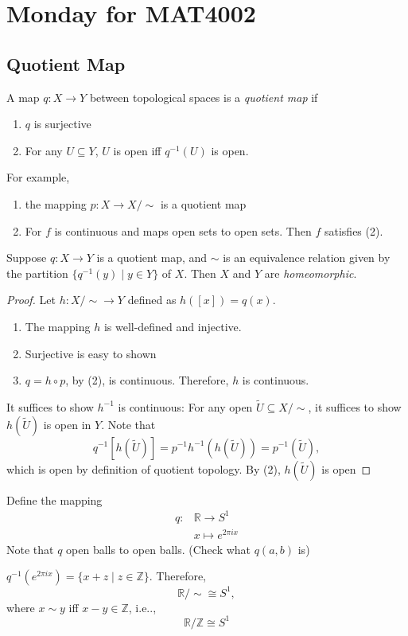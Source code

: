 \section{Monday for MAT4002}
\subsection{Quotient Map}
\begin{definition}
A map $q:X\to Y$ between topological spaces is a \emph{quotient map} if 
\begin{enumerate}
\item
$q$ is surjective
\item
For any $U\subseteq Y$, $U$ is open iff $q^{-1}(U)$ is open.
\end{enumerate}
\end{definition}
For example, 
\begin{enumerate}
\item
the mapping $p:X\to X/\sim$ is a quotient map
\item
For $f$ is continuous and maps open sets to open sets. Then $f$ satisfies (2).
\end{enumerate}

\begin{proposition}
Suppose $q:X\to Y$ is a quotient map, and $\sim$ is an equivalence relation given by the partition $\{q^{-1}(y)\mid y\in Y\}$ of $X$.
Then $X$ and $Y$ are \emph{homeomorphic}.
\end{proposition}
\begin{proof}
Let $h:X/\sim\to Y$ defined as $h([x]) = q(x)$.
\begin{enumerate}
\item
The mapping $h$ is well-defined and injective.
\item
Surjective is easy to shown
\item
$q = h\circ p$, by (2), is continuous. Therefore, $h$ is continuous.
\end{enumerate}
It suffices to show $h^{-1}$ is continuous:
For any open $\tilde{U}\subseteq X/\sim$, it suffices to show $h(\tilde{U})$ is open in $Y$. Note that 
\[
q^{-1}[h(\tilde{U})] = p^{-1}h^{-1}(h(\tilde{U}))=p^{-1}(\tilde{U}),
\]
which is open by definition of quotient topology.
By (2), $h(\tilde{U})$ is open
\end{proof}

\begin{example}
Define the mapping
\[
\begin{array}{ll}
q:&\mathbb{R}\to S^1\\
&x\mapsto e^{2\pi i x}
\end{array}
\]
Note that $q$ open balls to open balls. (Check what $q(a,b)$ is)

$q^{-1}(e^{2\pi i x}) = \{x+z\mid z\in\mathbb{Z}\}$. Therefore, 
\[
\mathbb{R}/\sim\cong S^1,
\]
where $x\sim y$ iff $x-y\in\mathbb{Z}$, i.e..,
\[
\mathbb{R}/\mathbb{Z}\cong S^1
\]
\end{example}


